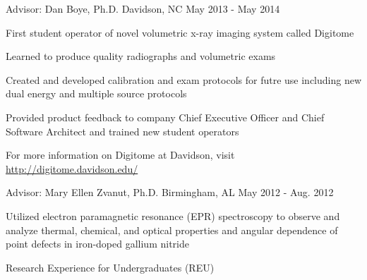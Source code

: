 %
\newpage
{}

\begin{cventries}


    \cventry
      {Advisor: Dan Boye, Ph.D.} %
      {} %
      {Davidson, NC} %
      {May 2013 - May 2014} %
      {
        \begin{cvitems} %
          \item {First student operator of novel volumetric x-ray imaging system called Digitome}
          \item {Learned to produce quality radiographs and volumetric exams}
          \item {Created and developed calibration and exam protocols for futre use including new dual energy and multiple source protocols}
          \item {Provided product feedback to company Chief Executive Officer and Chief Software Architect and trained new student operators}
          \item {For more information on Digitome at Davidson, visit \url{http://digitome.davidson.edu/}}
        \end{cvitems}
      }
      {}
\end{cventries}
%
\begin{cventries}
    \cventry
      {Advisor: Mary Ellen Zvanut, Ph.D.} %
      {} %
      {Birmingham, AL} %
      {May 2012 - Aug. 2012} %
      {
        \begin{cvitems} %
          \item {Utilized electron paramagnetic resonance (EPR) spectroscopy to observe and analyze thermal, chemical, and optical properties and angular dependence of point defects in iron-doped gallium nitride}
        \end{cvitems}
      }
      {\textnormal{Research Experience for Undergraduates (REU)}}

\end{cventries}

